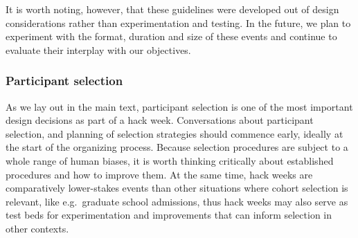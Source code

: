 \documentclass{aastex62}
\begin{document}
It is worth noting, however, that these guidelines were developed out of design considerations rather than experimentation and testing. In the future, we plan to experiment with the format, duration and size of these events and continue to evaluate their interplay with our objectives.

\subsubsection{Participant selection}

As we lay out in the main text, participant selection is one of the most important design decisions as part of a hack week. Conversations about participant selection, and planning of selection strategies should commence early, ideally at the start of the organizing process.
Because selection procedures are subject to a whole range of human biases, it is worth thinking critically about established procedures and how to improve them. At the same time, hack weeks are comparatively lower-stakes events than other situations where cohort selection is relevant, like e.g.\ graduate school admissions, thus hack weeks may also serve as test beds for experimentation and improvements that can inform selection in other contexts.
\end{document}
